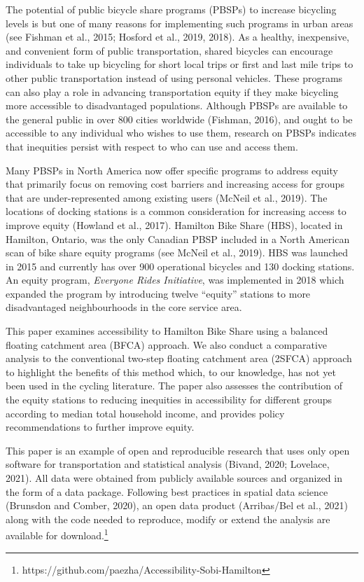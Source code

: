 \documentclass[]{elsarticle} %
\begin{document}
The potential of public bicycle share programs (PBSPs) to increase
bicycling levels is but one of many reasons for implementing such
programs in urban areas (see Fishman et al., 2015; Hosford et al., 2019,
2018). As a healthy, inexpensive, and convenient form of public
transportation, shared bicycles can encourage individuals to take up
bicycling for short local trips or first and last mile trips to other
public transportation instead of using personal vehicles. These programs
can also play a role in advancing transportation equity if they make
bicycling more accessible to disadvantaged populations. Although PBSPs
are available to the general public in over 800 cities worldwide
(Fishman, 2016), and ought to be accessible to any individual who wishes
to use them, research on PBSPs indicates that inequities persist with
respect to who can use and access them.

Many PBSPs in North America now offer specific programs to address
equity that primarily focus on removing cost barriers and increasing
access for groups that are under-represented among existing users
(McNeil et al., 2019). The locations of docking stations is a common
consideration for increasing access to improve equity (Howland et al.,
2017). Hamilton Bike Share (HBS), located in Hamilton, Ontario, was the
only Canadian PBSP included in a North American scan of bike share
equity programs (see McNeil et al., 2019). HBS was launched in 2015 and
currently has over 900 operational bicycles and 130 docking stations. An
equity program, \emph{Everyone Rides Initiative}, was implemented in
2018 which expanded the program by introducing twelve ``equity''
stations to more disadvantaged neighbourhoods in the core service area.

This paper examines accessibility to Hamilton Bike Share using a
balanced floating catchment area (BFCA) approach. We also conduct a
comparative analysis to the conventional two-step floating catchment
area (2SFCA) approach to highlight the benefits of this method which, to
our knowledge, has not yet been used in the cycling literature. The
paper also assesses the contribution of the equity stations to reducing
inequities in accessibility for different groups according to median
total household income, and provides policy recommendations to further
improve equity.

This paper is an example of open and reproducible research that uses
only open software for transportation and statistical analysis (Bivand,
2020; Lovelace, 2021). All data were obtained from publicly available
sources and organized in the form of a data package. Following best
practices in spatial data science (Brunsdon and Comber, 2020), an open
data product (Arribas/Bel et al., 2021) along with the code needed to
reproduce, modify or extend the analysis are available for
download.\footnote{https://github.com/paezha/Accessibility-Sobi-Hamilton}
\end{document}
